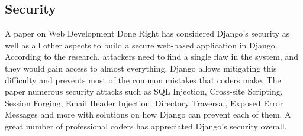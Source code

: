 \documentclass[../main.tex]{subfiles}
\begin{document}
\subsection{Security}
A paper on Web Development Done Right\cite{Holovaty2007TheDG} has considered Django's security as well as all other aspects to build a secure web-based application in Django. According to the research, attackers need to find a single flaw in the system, and they would gain access to almost everything. Django allows mitigating this difficulty and prevents most of the common mistakes that coders make. The paper numerous security attacks such as SQL Injection, Cross-site Scripting, Session Forging, Email Header Injection, Directory Traversal, Exposed Error Messages and more with solutions on how Django can prevent each of them. A great number of professional coders has appreciated Django's security overall.
\end{document}
